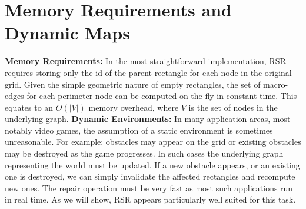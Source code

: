 \section{Memory Requirements and Dynamic Maps}
\label{sec:memory}
\textbf{Memory Requirements: }
In the most straightforward implementation, RSR requires storing only the id of the
parent rectangle for each node in the original grid. 
Given the simple geometric nature of empty rectangles, the set of macro-edges
for each perimeter node can be computed on-the-fly in constant time. 
This equates to an $O(|V|)$ memory overhead, where $V$ is the set of nodes
in the underlying graph.
\newline \noindent
\textbf{Dynamic Environments: }
In many application areas, most notably video games, the assumption of a static 
environment is sometimes unreasonable.
For example: obstacles may appear on the grid or existing obstacles may be
destroyed as the game progresses.
In such cases the underlying graph representing the world must be updated.
If a new obstacle appears, or an existing one is destroyed,
we can simply invalidate the affected rectangles and recompute new ones.
The repair operation must be very fast as most such applications run in real
time. As we will show, RSR appears particularly well suited for this task.
